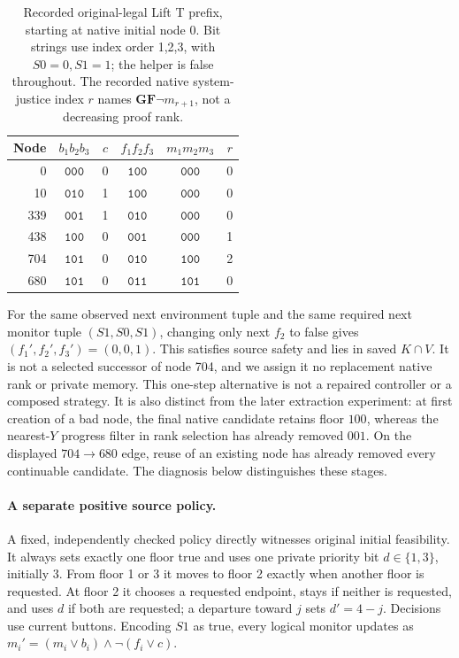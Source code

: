 \begin{table}[ht]
\centering\small
\caption{Recorded original-legal Lift T prefix, starting at native
initial node 0. Bit strings use index order 1,2,3, with $S0=0,S1=1$;
the helper is false throughout. The recorded native system-justice
index $r$ names $\mathbf{G}\mathbf{F}\neg m_{r+1}$,
not a decreasing proof rank.}
\label{tab:lift-t-prefix}
\begin{tabular}{@{}rccccr@{}}
\toprule
Node & $b_1b_2b_3$ & $c$ & $f_1f_2f_3$ & $m_1m_2m_3$ & $r$\\
\midrule
0   & $\mathtt{000}$ & 0 & $\mathtt{100}$ & $\mathtt{000}$ & 0\\
10  & $\mathtt{010}$ & 1 & $\mathtt{100}$ & $\mathtt{000}$ & 0\\
339 & $\mathtt{001}$ & 1 & $\mathtt{010}$ & $\mathtt{000}$ & 0\\
438 & $\mathtt{100}$ & 0 & $\mathtt{001}$ & $\mathtt{000}$ & 1\\
704 & $\mathtt{101}$ & 0 & $\mathtt{010}$ & $\mathtt{100}$ & 2\\
680 & $\mathtt{101}$ & 0 & $\mathtt{011}$ & $\mathtt{101}$ & 0\\
\bottomrule
\end{tabular}
\end{table}

For the same observed next environment tuple and the same required next
monitor tuple $(S1,S0,S1)$, changing only next $f_2$ to false gives
$(f_1',f_2',f_3')=(0,0,1)$. This satisfies source safety and lies in
saved $K\cap V$. It is not a selected successor of node 704, and we
assign it no replacement native rank or private memory. This one-step
alternative is not a repaired controller or a composed strategy.
It is also distinct from the later extraction experiment: at first
creation of a bad node, the final native candidate retains floor
$100$, whereas the nearest-$Y$ progress filter in rank selection has
already removed $001$. On the displayed
$704\to680$ edge, reuse of an existing node has already removed every
continuable candidate. The diagnosis below distinguishes these stages.

\paragraph{A separate positive source policy.}
A fixed, independently checked policy directly witnesses original initial
feasibility. It always sets exactly one floor true and uses one private
priority bit $d\in\{1,3\}$, initially 3. From floor 1 or 3 it moves to
floor 2 exactly when another floor is requested. At floor 2 it chooses
a requested endpoint, stays if neither is requested, and uses $d$ if
both are requested; a departure toward $j$ sets $d'=4-j$. Decisions use
current buttons. Encoding $S1$ as true, every logical monitor updates as
$m_i'=(m_i\lor b_i)\land\neg(f_i\lor c)$.

